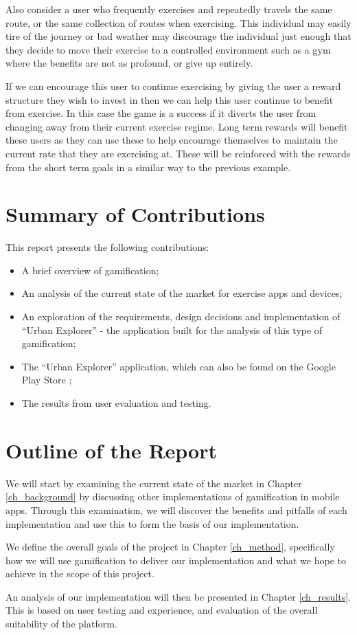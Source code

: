Also consider a user who frequently exercises and repeatedly travels
the same route, or the same collection of routes when exercising. This
individual may easily tire of the journey or bad weather may
discourage the individual just enough that they decide to move their
exercise to a controlled environment such as a gym where the benefits
are not as profound, or give up entirely. 

If we can encourage this user to continue exercising by giving the
user a reward structure they wish to invest in then we can help this
user continue to benefit from exercise. In this case the game is a
success if it diverts the user from changing away from their current
exercise regime. Long term rewards will benefit these users as they
can use these to help encourage themselves to maintain the current
rate that they are exercising at. These will be reinforced with the
rewards from the short term goals in a similar way to the previous
example. 

\section{Summary of Contributions}

This report presents the following contributions: 

\begin{itemize}
  \item A brief overview of gamification;
  \item An analysis of the current state of the market for exercise
    apps and devices;
  \item An exploration of the requirements, design decisions and
    implementation of ``Urban Explorer'' - the application built for
    the analysis of this type of gamification;
  \item The ``Urban Explorer'' application, which can also be found on
    the Google Play Store \cite{app_store_link};
  \item The results from user evaluation and testing.
\end{itemize}

\section{Outline of the Report}

We will start by examining the current state of the market in Chapter
\ref{ch_background} by
discussing other implementations of gamification in mobile
apps. Through this examination, we will discover the benefits and
pitfalls of each implementation and use this to form the basis of our
implementation. 

We define the overall goals of the project in Chapter \ref{ch_method},
specifically how we will use gamification to deliver our
implementation and what we hope to achieve in the scope of this
project.

An analysis of our implementation will then be presented in Chapter
\ref{ch_results}. This is based on user testing and experience, and evaluation of the
overall suitability of the platform.
